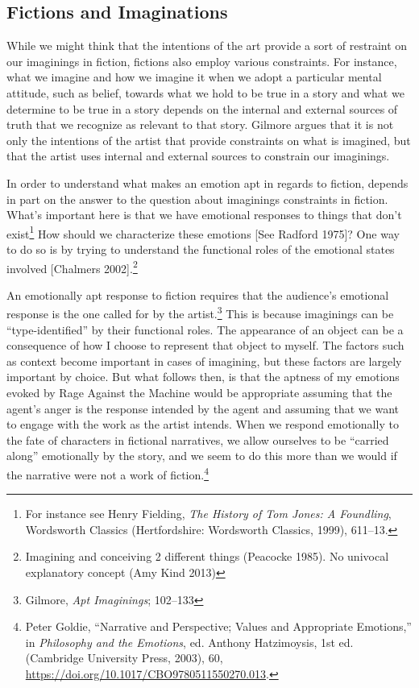 \documentclass[phdthesis,12pt,final]{wuthesis}
\theoremstyle{definition}
\theoremstyle{definition}
\theoremstyle{definition}
\theoremstyle{definition}
\theoremstyle{remark}
\begin{document}
\subsection*{Fictions and Imaginations}\label{fictions-and-imaginations}

While we might think that the intentions of the art provide a sort of restraint on our imaginings in fiction, fictions also employ various constraints. For instance, what we imagine and how we imagine it when we adopt a particular mental attitude, such as belief, towards what we hold to be true in a story and what we determine to be true in a story depends on the internal and external sources of truth that we recognize as relevant to that story. Gilmore argues that it is not only the intentions of the artist that provide constraints on what is imagined, but that the artist uses internal and external sources to constrain our imaginings.

In order to understand what makes an emotion apt in regards to fiction, depends in part on the answer to the question about imaginings constraints in fiction. What's important here is that we have emotional responses to things that don't exist\footnote{For instance see Henry Fielding, \emph{The {History} of {Tom Jones}: {A} Foundling}, Wordsworth {Classics} (Hertfordshire: Wordsworth Classics, 1999), 611--13.} How should we characterize these emotions {[}See Radford 1975{]}? One way to do so is by trying to understand the functional roles of the emotional states involved {[}Chalmers 2002{]}.\footnote{Imagining and conceiving 2 different things (Peacocke 1985). No univocal explanatory concept (Amy Kind 2013)}

An emotionally apt response to fiction requires that the audience's emotional response is the one called for by the artist.\footnote{Gilmore, \emph{Apt {Imaginings}}; 102--133} This is because imaginings can be ``type-identified'' by their functional roles. The appearance of an object can be a consequence of how I choose to represent that object to myself. The factors such as context become important in cases of imagining, but these factors are largely important by choice. But what follows then, is that the aptness of my emotions evoked by Rage Against the Machine would be appropriate assuming that the agent's anger is the response intended by the agent and assuming that we want to engage with the work as the artist intends. When we respond emotionally to the fate of characters in fictional narratives, we allow ourselves to be ``carried along'' emotionally by the story, and we seem to do this more than we would if the narrative were not a work of fiction.\footnote{Peter Goldie, {``Narrative and {Perspective}; {Values} and {Appropriate Emotions},''} in \emph{Philosophy and the {Emotions}}, ed. Anthony Hatzimoysis, 1st ed. (Cambridge University Press, 2003), 60, \url{https://doi.org/10.1017/CBO9780511550270.013}.}
\end{document}
